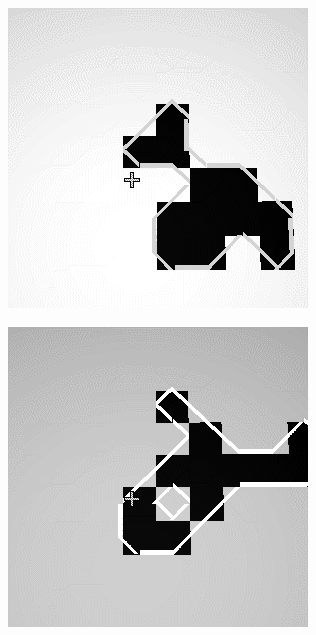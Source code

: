 \documentclass{GlobalDocument}
\begin{document}
\begin{figure}[htb]
 \centering
  \begin{subfigure}{.24\textwidth}
    \centering
    \includegraphics[width=.9\linewidth]{images/maps_0000}
  \end{subfigure}%
  \begin{subfigure}{.24\textwidth}
    \centering
    \includegraphics[width=.9\linewidth]{images/maps_0001}

\end{subfigure}
\end{figure}
\end{document}
